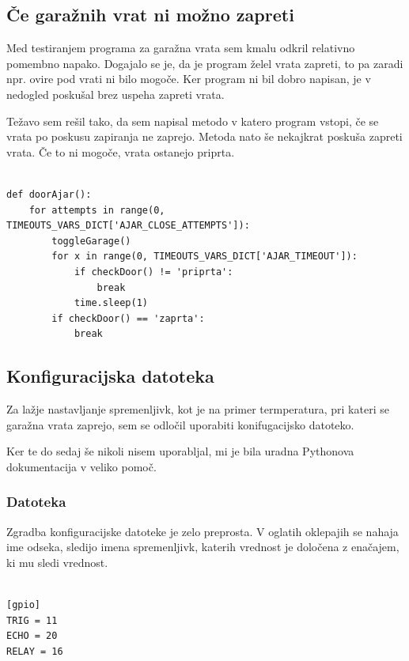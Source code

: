 \documentclass[11pt]{article}
\begin{document}
\subsection{Če garažnih vrat ni možno zapreti}
Med testiranjem programa za garažna vrata sem kmalu odkril relativno pomembno napako. Dogajalo se je, da je program želel vrata zapreti, to pa zaradi npr. ovire pod vrati ni bilo mogoče. Ker program ni bil dobro napisan, je v nedogled poskušal brez uspeha zapreti vrata.

Težavo sem rešil tako, da sem napisal metodo v katero program vstopi, če se vrata po poskusu zapiranja ne zaprejo. Metoda nato še nekajkrat poskuša zapreti vrata. Če to ni mogoče, vrata ostanejo priprta.

\begin{verbatim}

def doorAjar():
    for attempts in range(0, TIMEOUTS_VARS_DICT['AJAR_CLOSE_ATTEMPTS']):
        toggleGarage()
        for x in range(0, TIMEOUTS_VARS_DICT['AJAR_TIMEOUT']):
            if checkDoor() != 'priprta':
                break
            time.sleep(1)
        if checkDoor() == 'zaprta':
            break
\end{verbatim}

\subsection{Konfiguracijska datoteka}
Za lažje nastavljanje spremenljivk, kot je na primer termperatura, pri kateri se garažna vrata zaprejo, sem se odločil uporabiti konifugacijsko datoteko.

Ker te do sedaj še nikoli nisem uporabljal, mi je bila uradna Pythonova dokumentacija \cite{Py_configParser} v veliko pomoč.
\newpage
\subsubsection{Datoteka}
Zgradba konfiguracijske datoteke je zelo preprosta. V oglatih oklepajih se nahaja ime odseka, sledijo imena spremenljivk, katerih vrednost je določena z enačajem, ki mu sledi vrednost.
\begin{verbatim}

[gpio]
TRIG = 11
ECHO = 20
RELAY = 16
\end{verbatim}
\end{document}
